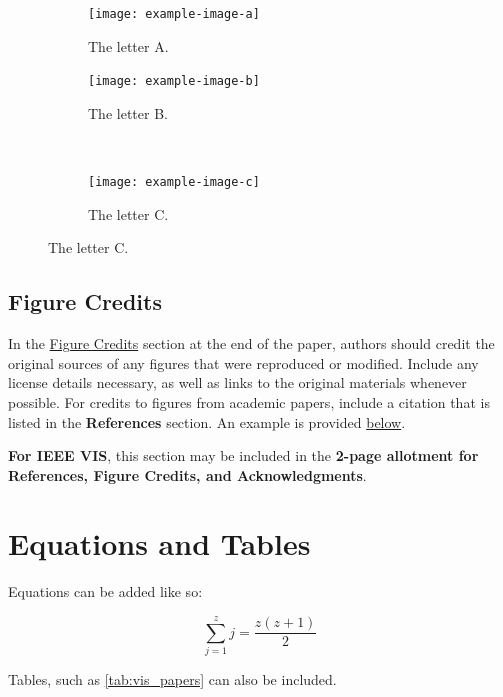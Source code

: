 \documentclass[journal]{vgtc}                     %
\begin{document}
\begin{figure}[tbp]
  \centering
  \begin{subfigure}[b]{0.45\columnwidth}
  	\centering
  	\texttt{[image: example-image-a]}
  	\caption{The letter A.}
  	\label{fig:ex_subfigs_a}
  \end{subfigure}%
  \hfill%
  \begin{subfigure}[b]{0.45\columnwidth}
  	\centering
  	\texttt{[image: example-image-b]}
  	\caption{The letter B.}
  	\label{fig:ex_subfigs_b}
  \end{subfigure}%
  \\%
  \begin{subfigure}[b]{0.45\columnwidth}
  	\centering
  	\texttt{[image: example-image-c]}
  	\caption{The letter C.}
  	\label{fig:ex_subfigs_c}
  \end{subfigure}%
  \label{fig:ex_subfigs}
\end{figure}

\subsection{Figure Credits}
\label{sec:figure_credits_inst}

In the \hyperref[sec:figure_credits]{Figure Credits} section at the end of the paper, authors should credit the original sources of any figures that were reproduced or modified.
Include any license details necessary, as well as links to the original materials whenever possible.
For credits to figures from academic papers, include a citation that is listed in the \textbf{References} section.
An example is provided \hyperref[sec:figure_credits]{below}.

\textbf{For IEEE VIS}, this section may be included in the \textbf{2-page allotment for References, Figure Credits, and Acknowledgments}.



\section{Equations and Tables}

Equations can be added like so:

\begin{equation}
  \label{eq:sum}
  \sum_{j=1}^{z} j = \frac{z(z+1)}{2}
\end{equation}

Tables, such as \cref{tab:vis_papers} can also be included.
\end{document}
